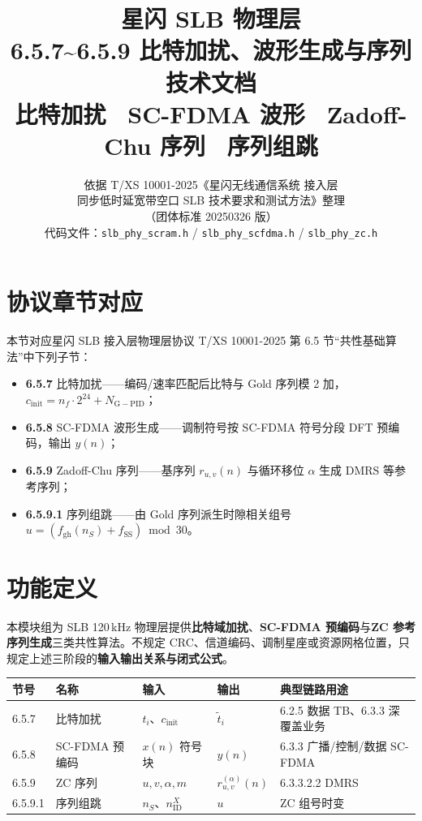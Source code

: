 \documentclass[11pt,a4paper]{ctexart}
\title{%
  \textbf{星闪 SLB 物理层}\\[0.4em]
  \Large 6.5.7\textasciitilde 6.5.9 比特加扰、波形生成与序列技术文档\\[0.3em]
  \large 比特加扰 \textbullet\ SC-FDMA 波形 \textbullet\ Zadoff-Chu 序列 \textbullet\ 序列组跳
}
\author{依据 T/XS 10001-2025《星闪无线通信系统 接入层\\
同步低时延宽带空口 SLB 技术要求和测试方法》整理\\
（团体标准 20250326 版）\\[0.5em]
代码文件：\texttt{slb\_phy\_scram.h} / \texttt{slb\_phy\_scfdma.h} / \texttt{slb\_phy\_zc.h}}
\date{}
\newcommand{\NGPID}{N_{\mathrm{G-PID}}}
\begin{document}
\maketitle
\tableofcontents
\newpage

\section{协议章节对应}

本节对应星闪 SLB 接入层物理层协议 T/XS 10001-2025 第 6.5 节``共性基础算法''中下列子节：
\begin{itemize}[nosep]
  \item \textbf{6.5.7} 比特加扰——编码/速率匹配后比特与 Gold 序列模 2 加，$c_{\mathrm{init}}=n_f\cdot 2^{24}+\NGPID$；
  \item \textbf{6.5.8} SC-FDMA 波形生成——调制符号按 SC-FDMA 符号分段 DFT 预编码，输出 $y(n)$；
  \item \textbf{6.5.9} Zadoff-Chu 序列——基序列 $r_{u,v}(n)$ 与循环移位 $\alpha$ 生成 DMRS 等参考序列；
  \item \textbf{6.5.9.1} 序列组跳——由 Gold 序列派生时隙相关组号 $u=(f_{\mathrm{gh}}(n_S)+f_{\mathrm{SS}})\bmod 30$。
\end{itemize}

\section{功能定义}

本模块组为 SLB 120\,kHz 物理层提供\textbf{比特域加扰}、\textbf{SC-FDMA 预编码}与\textbf{ZC 参考序列生成}三类共性算法。不规定 CRC、信道编码、调制星座或资源网格位置，只规定上述三阶段的\textbf{输入输出关系与闭式公式}。

\begin{table}[h]
\centering
\small
\begin{tabular}{lllll}
\toprule
\textbf{节号} & \textbf{名称} & \textbf{输入} & \textbf{输出} & \textbf{典型链路用途} \\
\midrule
6.5.7 & 比特加扰 & $t_i$、$c_{\mathrm{init}}$ & $\tilde{t}_i$ & 6.2.5 数据 TB、6.3.3 深覆盖业务 \\
6.5.8 & SC-FDMA 预编码 & $x(n)$ 符号块 & $y(n)$ & 6.3.3 广播/控制/数据 SC-FDMA \\
6.5.9 & ZC 序列 & $u,v,\alpha,m$ & $r_{u,v}^{(\alpha)}(n)$ & 6.3.3.2.2 DMRS \\
6.5.9.1 & 序列组跳 & $n_S$、$n_{\mathrm{ID}}^{X}$ & $u$ & ZC 组号时变 \\
\bottomrule
\end{tabular}
\end{table}
\end{document}
